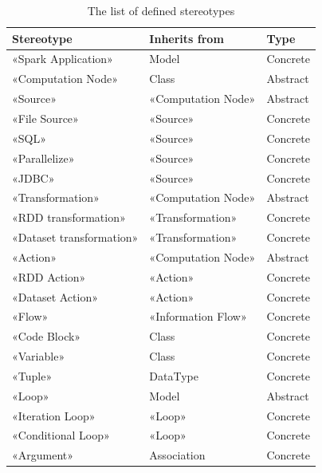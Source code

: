 \vspace{20px}
\begin{table}[H]
\centering
\begin{tabular}{@{}lll@{}}
\toprule
Stereotype               & Inherits from      & Type     \\ \midrule
«Spark Application»      & Model              & Concrete \\
«Computation Node»       & Class              & Abstract \\
«Source»                 & «Computation Node» & Abstract \\
«File Source»            & «Source»           & Concrete \\
«SQL»                    & «Source»           & Concrete \\
«Parallelize»            & «Source»           & Concrete \\
«JDBC»                   & «Source»           & Concrete \\
«Transformation»         & «Computation Node» & Abstract \\
«RDD transformation»     & «Transformation»   & Concrete \\
«Dataset transformation» & «Transformation»   & Concrete \\
«Action»                 & «Computation Node» & Abstract \\
«RDD Action»             & «Action»           & Concrete \\
«Dataset Action»         & «Action»           & Concrete \\
«Flow»                   & «Information Flow» & Concrete \\
«Code Block»             & Class              & Concrete \\
«Variable»               & Class              & Concrete \\
«Tuple»                  & DataType           & Concrete \\
«Loop»                   & Model              & Abstract \\
«Iteration Loop»         & «Loop»             & Concrete \\
«Conditional Loop»       & «Loop»             & Concrete \\
«Argument»               & Association        & Concrete \\ \bottomrule
\end{tabular}
\caption{\label{tab:table-name}The list of defined stereotypes}
\end{table}




